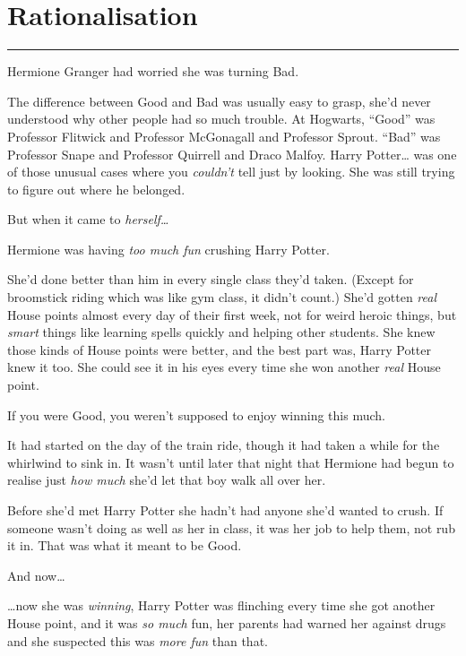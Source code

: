 \chapter{Rationalisation}\label{rationalisation}

\begin{center}\rule{3in}{0.4pt}\end{center}

Hermione Granger had worried she was turning Bad.

The difference between Good and Bad was usually easy to grasp, she'd
never understood why other people had so much trouble. At Hogwarts,
``Good'' was Professor Flitwick and Professor McGonagall and Professor
Sprout. ``Bad'' was Professor Snape and Professor Quirrell and Draco
Malfoy. Harry Potter\ldots{} was one of those unusual cases where you
\emph{couldn't} tell just by looking. She was still trying to figure out
where he belonged.

But when it came to \emph{herself\ldots{}}

Hermione was having \emph{too much fun} crushing Harry Potter.

She'd done better than him in every single class they'd taken. (Except
for broomstick riding which was like gym class, it didn't count.) She'd
gotten \emph{real} House points almost every day of their first week,
not for weird heroic things, but \emph{smart} things like learning
spells quickly and helping other students. She knew those kinds of House
points were better, and the best part was, Harry Potter knew it too. She
could see it in his eyes every time she won another \emph{real} House
point.

If you were Good, you weren't supposed to enjoy winning this much.

It had started on the day of the train ride, though it had taken a while
for the whirlwind to sink in. It wasn't until later that night that
Hermione had begun to realise just \emph{how much} she'd let that boy
walk all over her.

Before she'd met Harry Potter she hadn't had anyone she'd wanted to
crush. If someone wasn't doing as well as her in class, it was her job
to help them, not rub it in. That was what it meant to be Good.

And now\ldots{}

\ldots{}now she was \emph{winning}, Harry Potter was flinching every
time she got another House point, and it was \emph{so much} fun, her
parents had warned her against drugs and she suspected this was
\emph{more fun} than that.

